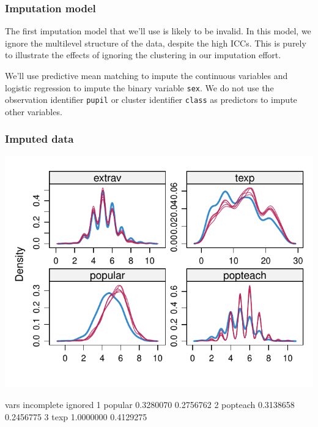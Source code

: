 \documentclass[
]{jss}
\begin{document}
\hypertarget{imputation-model}{%
\subsubsection{Imputation model}\label{imputation-model}}

The first imputation model that we'll use is likely to be invalid. In
this model, we ignore the multilevel structure of the data, despite the
high ICCs. This is purely to illustrate the effects of ignoring the
clustering in our imputation effort.

We'll use predictive mean matching to impute the continuous variables
and logistic regression to impute the binary variable \texttt{sex}. We
do not use the observation identifier \texttt{pupil} or cluster
identifier \texttt{class} as predictors to impute other variables.

\begin{CodeChunk}
\end{CodeChunk}

\hypertarget{imputed-data}{%
\subsubsection{Imputed data}\label{imputed-data}}

\begin{CodeChunk}


\begin{center}\includegraphics{Manuscript_files/figure-latex/pop_ignored_eval-1} \end{center}

\begin{CodeOutput}
      vars incomplete   ignored
1  popular  0.3280070 0.2756762
2 popteach  0.3138658 0.2456775
3     texp  1.0000000 0.4129275
\end{CodeOutput}
\end{CodeChunk}
\end{document}

